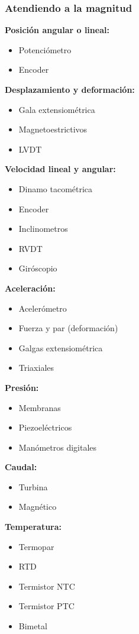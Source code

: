 \subsubsection{Atendiendo a la magnitud}

\textbf{Posición angular o lineal:}
\begin{itemize}
 \item Potenciómetro
 \item Encoder
\end{itemize}

\textbf{Desplazamiento y deformación:}
\begin{itemize}
 \item Gala extensiométrica
 \item Magnetoestrictivos
 \item LVDT
\end{itemize}

\textbf{Velocidad lineal y angular:}
\begin{itemize}
  \item     Dinamo tacométrica
  \item     Encoder
  \item     Inclinometros
  \item     RVDT
  \item     Giróscopio
\end{itemize}

\textbf{Aceleración:}
\begin{itemize}
  \item     Acelerómetro
  \item     Fuerza y par (deformación)
  \item     Galgas extensiométrica
  \item     Triaxiales
\end{itemize}

\textbf{Presión:}
\begin{itemize}
  \item     Membranas
  \item     Piezoeléctricos
  \item     Manómetros digitales
\end{itemize}

\textbf{Caudal:}
\begin{itemize}
  \item     Turbina
  \item     Magnético
\end{itemize}

\textbf{Temperatura:}
\begin{itemize}
  \item     Termopar
  \item     RTD
  \item     Termistor NTC
  \item     Termistor PTC
  \item     Bimetal
\end{itemize}


